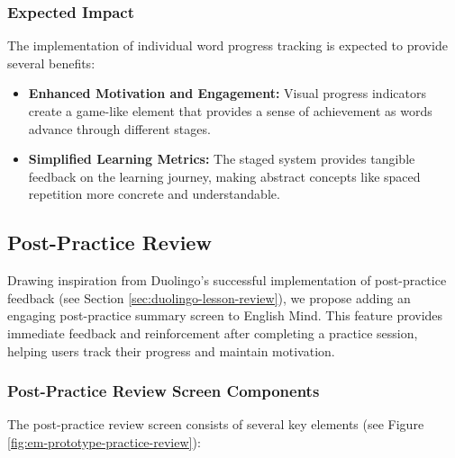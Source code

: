 \subsubsection{Expected Impact}

The implementation of individual word progress tracking is expected to provide several benefits:

\begin{itemize}
    \item \textbf{Enhanced Motivation and Engagement:} Visual progress indicators create a game-like element that provides a sense of achievement as words advance through different stages.
    
    \item \textbf{Simplified Learning Metrics:} The staged system provides tangible feedback on the learning journey, making abstract concepts like spaced repetition more concrete and understandable.
\end{itemize}

\subsection{Post-Practice Review}

Drawing inspiration from Duolingo's successful implementation of post-practice feedback (see Section \ref{sec:duolingo-lesson-review}), we propose adding an engaging post-practice summary screen to English Mind. This feature provides immediate feedback and reinforcement after completing a practice session, helping users track their progress and maintain motivation.

\subsubsection{Post-Practice Review Screen Components}

The post-practice review screen consists of several key elements (see Figure \ref{fig:em-prototype-practice-review}):


